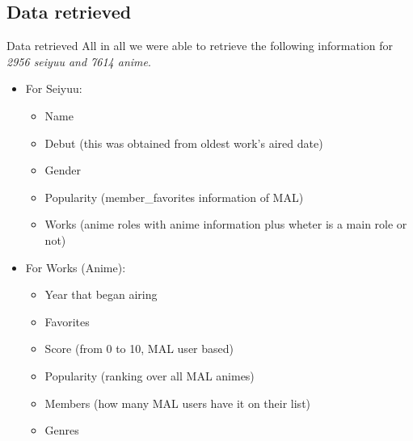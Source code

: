 \subsection{Data retrieved}
\begin{frame}{Data retrieved}
All in all we were able to retrieve the following information for \emph{2956 seiyuu and 7614 anime}.

\begin{itemize}
	\item For Seiyuu:
	\begin{itemize}
		\item Name
		\item Debut (this was obtained from oldest work's aired date)
		\item Gender
		\item Popularity (member\_favorites information of MAL)
		\item Works (anime roles with anime information plus wheter is a main role or not)
	\end{itemize}
	\item For Works (Anime):
	\begin{itemize}
		\item Year that began airing
		\item Favorites
		\item Score (from 0 to 10, MAL user based)
		\item Popularity (ranking over all MAL animes)
		\item Members (how many MAL users have it on their list)
		\item Genres
	\end{itemize}
\end{itemize}
\end{frame}